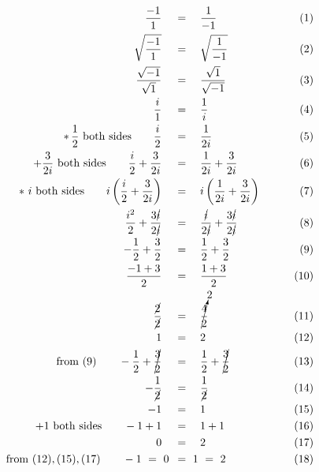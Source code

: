 \begin{align*}
\frac{-1}{1}\quad&\,=\quad\frac{1}{-1}\qquad&\,(1)\\
\sqrt{\frac{-1}{1}}\quad&\,=\quad\sqrt{\frac{1}{-1}}\qquad&\,(2)\\
\frac{\sqrt{-1}}{\sqrt{1}}\quad&\,=\quad\frac{\sqrt{1}}{\sqrt{-1}}\qquad&\,(3)\\
\frac{i}{1}\quad&\,=\quad\frac{1}{i}\qquad&\,(4)\\
*\,\frac{1}{2}\mathrm{~both~sides}\qquad\frac{i}{2}\quad&\,=\quad\frac{1}{2i}\qquad&\,(5)\\
+\frac{3}{2i}\mathrm{~both~sides}\qquad\frac{i}{2}+\frac{3}{2i}\quad&\,=\quad\frac{1}{2i}+\frac{3}{2i}\qquad&\,(6)\\
*~i\mathrm{~both~sides}\qquad i\left(\frac{i}{2}+\frac{3}{2i}\right)\quad&\,=\quad i\left(\frac{1}{2i}+\frac{3}{2i}\right)\qquad&\,(7)\\
\frac{i^2}{2}+\frac{3\cancel{i}}{2\cancel{i}}\quad&\,=\quad\frac{\cancel{i}}{2\cancel{i}}+\frac{3\cancel{i}}{2\cancel{i}}\qquad&\,(8)\\
-\frac{1}{2}+\frac{3}{2}\quad&\,=\quad\frac{1}{2}+\frac{3}{2}\qquad&\,(9)\\
\frac{-1+3}{2}\quad&\,=\quad\frac{1+3}{2}\qquad&\,(10)\\
\frac{\cancel{2}}{\cancel{2}}\quad&\,=\quad\cancelto{2}{\frac{4}{2}}\qquad&\,(11)\\
1\quad&\,=\quad2\qquad&\,(12)\\
\mathrm{from~(9)}\qquad-\frac{1}{2}+\cancel{\frac{3}{2}}\quad&\,=\quad\frac{1}{2}+\cancel{\frac{3}{2}}\qquad&\,(13)\\
-\frac{1}{\cancel{2}}\quad&\,=\quad\frac{1}{\cancel{2}}\qquad&\,(14)\\
-1\quad&\,=\quad1\qquad&\,(15)\\
+1\mathrm{~both~sides}\qquad-1+1\quad&\,=\quad1+1\qquad&\,(16)\\
0\quad&\,=\quad2\qquad&\,(17)\\
\mathrm{from~(12),(15),(17)}\qquad-1~=~0~&\,=~1~=~2\qquad&\,(18)
\end{align*}
